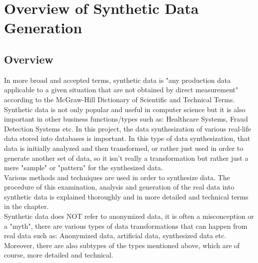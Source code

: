 \chapter{Overview of Synthetic Data Generation}
\section{Overview}
In more broad and accepted terms, synthetic data is "any production data applicable to a given situation that are not obtained by direct measurement" according to the McGraw-Hill Dictionary of Scientific and Technical Terms. \cite{McGrawSyntheticData}\\ Synthetic data is not only popular and useful in computer science but it is also important in other business functions/types such as: Healthcare Systems, Fraud Detection Systems etc. In this project, the data synthesization of various real-life data stored into databases is important. In this type of data synthesization, that data is initially analyzed and then transformed, or rather just used in order to generate another set of data, so it isn't really a transformation but rather just a mere "sample" or "pattern" for the synthesized data.\\
\newline
Various methods and techniques are used in order to synthesize data. The procedure of this examination, analysis and generation of the real data into synthetic data is explained thoroughly and in more detailed and technical terms in the  chapter.\\
Synthetic data does NOT refer to anonymized data, it is often a misconception or a "myth", there are various types of data transformations that can happen from real data such as: Anonymized data, artificial data, synthesized data etc. Moreover, there are also subtypes of the types mentioned above, which are of course, more detailed and technical.
